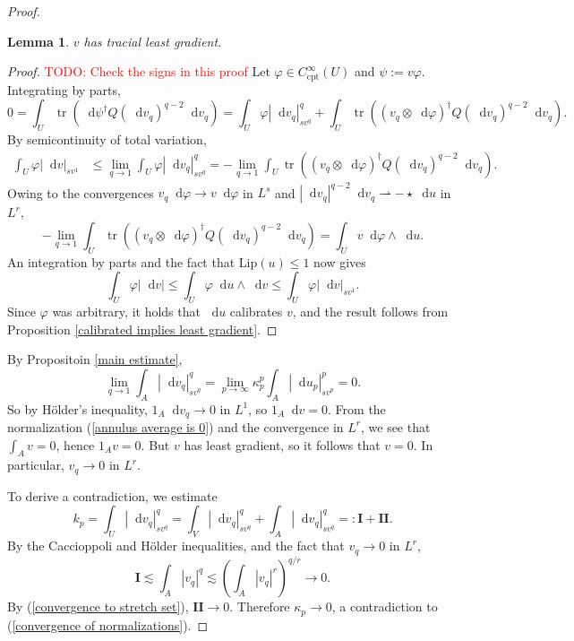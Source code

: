 \documentclass[reqno,11pt]{amsart}
\newcommand*\dif{\mathop{}\!\mathrm{d}}
\DeclareMathOperator{\tr}{tr}
\newcommand{\Lip}{\mathrm{Lip}}
\newcommand{\cpt}{\mathrm{cpt}}
\newtheorem{lemma}[theorem]{Lemma}
\newcommand{\weakto}{\rightharpoonup}
\theoremstyle{definition}
\numberwithin{equation}{section}
\newcommand\todo[1]{\textcolor{red}{TODO: #1}}
\begin{document}
\begin{proof}
\begin{lemma}
$v$ has tracial least gradient.
\end{lemma}
\begin{proof}
\todo{Check the signs in this proof}
Let $\varphi \in C^\infty_\cpt(U)$ and $\psi := v\varphi$.
Integrating by parts,
$$0 = \int_U \tr(\dif \psi^\dagger Q(\dif v_q)^{q - 2} \dif v_q) = \int_U \varphi |\dif v_q|_{sv^q}^q + \int_U \tr((v_q \otimes \dif \varphi)^\dagger Q(\dif v_q)^{q - 2} \dif v_q).$$
By semicontinuity of total variation,
\begin{align*}
\int_U \varphi |\dif v|_{sv^1}
&\leq \lim_{q \to 1} \int_U \varphi |\dif v_q|_{sv^q}^q 
= -\lim_{q \to 1} \int_U \tr((v_q \otimes \dif \varphi)^\dagger Q(\dif v_q)^{q - 2} \dif v_q).
\end{align*}
Owing to the convergences $v_q \dif \varphi \to v \dif \varphi$ in $L^s$ and $|\dif v_q|^{q - 2} \dif v_q \weakto -\star \dif u$ in $L^r$,
$$
-\lim_{q \to 1} \int_U \tr((v_q \otimes \dif \varphi)^\dagger Q(\dif v_q)^{q - 2} \dif v_q) = \int_U v\dif \varphi \wedge \dif u.
$$
An integration by parts and the fact that $\Lip(u) \leq 1$ now gives
$$\int_U \varphi |\dif v| \leq \int_U \varphi \dif u \wedge \dif v \leq \int_U \varphi |\dif v|_{sv^1}.$$
Since $\varphi$ was arbitrary, it holds that $\dif u$ calibrates $v$, and the result follows from Proposition \ref{calibrated implies least gradient}.
\end{proof}

By Propositoin \ref{main estimate},
\begin{equation}\label{convergence to stretch set}
\lim_{q \to 1} \int_A |\dif v_q|_{sv^q}^q = \lim_{p \to \infty} \kappa_p^p \int_A |\dif u_p|_{sv^p}^p = 0.
\end{equation}
So by H\"older's inequality, $1_A \dif v_q \to 0$ in $L^1$, so $1_A \dif v = 0$.
From the normalization (\ref{annulus average is 0}) and the convergence in $L^r$, we see that $\int_A v = 0$, hence $1_A v = 0$.
But $v$ has least gradient, so it follows that $v = 0$.
In particular, $v_q \to 0$ in $L^r$.

To derive a contradiction, we estimate
$$k_p = \int_U |\dif v_q|_{sv^q}^q = \int_V |\dif v_q|_{sv^q}^q + \int_A |\dif v_q|_{sv^q}^q =: \mathbf{I} + \mathbf{II}.$$
By the Caccioppoli and H\"older inequalities, and the fact that $v_q \to 0$ in $L^r$,
$$\mathbf{I} \lesssim \int_A |v_q|^q \lesssim \left(\int_A |v_q|^r\right)^{q/r} \to 0.$$
By (\ref{convergence to stretch set}), $\mathbf{II} \to 0$.
Therefore $\kappa_p \to 0$, a contradiction to (\ref{convergence of normalizations}).
\end{proof}
\end{document}
